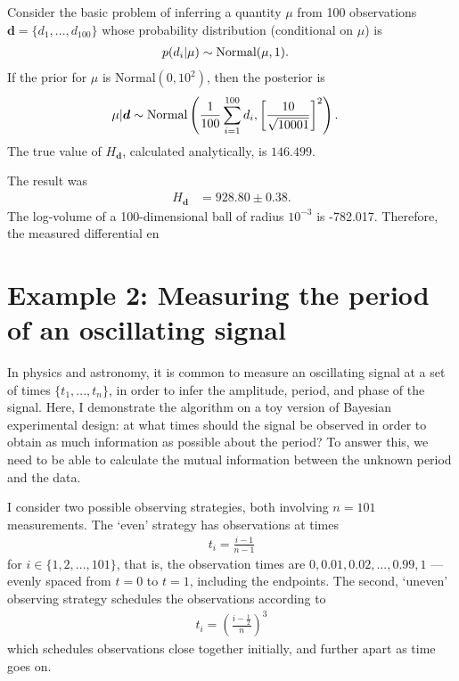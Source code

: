 \documentclass[entropy,article,accept,oneauthor,pdftex,10pt,a4paper]{mdpi}
\renewcommand{\d}{\boldsymbol{d}}
\begin{document}
Consider the basic problem of inferring a quantity $\mu$ from
100 observations $\d = \{d_1, ..., d_{100}\}$ whose
probability distribution (conditional on $\mu$) is
\begin{align}
p(d_i | \mu) &\sim \textnormal{Normal}(\mu, 1).
\end{align}
If the prior for $\mu$ is Normal$(0, 10^2)$, then the posterior is
\begin{align}
\mu | \d &\sim \textnormal{Normal}\left(
                                       \frac{1}{100}\sum_{i=1}^{100} d_i,
                                       \left[\frac{10}{\sqrt{10001}}\right]^2
                                       \right).
\end{align}
The true value of $H_{\d}$, calculated analytically, is $146.499$.


The result was
\begin{align}
H_{\d} &= 928.80 \pm 0.38.
\end{align}
The log-volume of a 100-dimensional ball of radius $10^{-3}$ is
-782.017. Therefore, the measured differential en
\section{Example 2: Measuring the period of an oscillating signal}

In physics and astronomy, it is common to measure an oscillating signal
at a set of times $\{t_1, ..., t_n\}$, in order to infer the amplitude,
period, and phase of the signal.
Here, I demonstrate the algorithm on a toy version
of Bayesian experimental design: at what times should the signal be
observed in order to obtain as much information as possible about the
period? To answer this, we need to be able to calculate the mutual
information between the unknown period and the data.

I consider two possible observing strategies, both involving
$n=101$ measurements. The `even' strategy has observations at times
\begin{align}
t_i = \frac{i-1}{n-1}
\end{align}
for $i \in \{1, 2, ..., 101\}$, that is, the observation times are
$0, 0.01, 0.02, ..., 0.99, 1$ ---
evenly spaced from $t=0$ to $t=1$, including the endpoints.
The second, `uneven' observing strategy schedules the observations
according to
\begin{align}
t_i = \left(\frac{i - \frac{1}{2}}{n}\right)^3
\end{align}
which schedules observations close together initially, and further apart
as time goes on.
\end{document}
